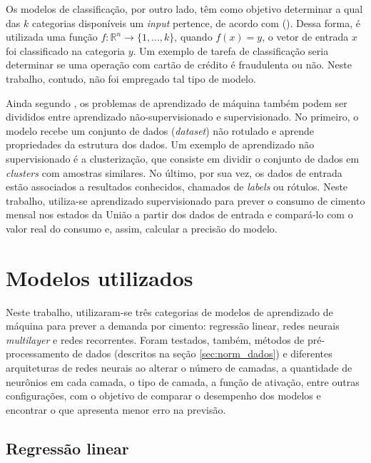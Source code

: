 Os modelos de classificação, por outro lado, têm como objetivo 
determinar a qual das $k$ categorias disponíveis um 
\textit{input} pertence, de acordo com (\cite{dl-oreilly}). Dessa forma, é utilizada uma função  
$ f : \mathbb{R}^n \rightarrow \{1,...,k\}$, quando 
$ f(x) = y$, o vetor de entrada $x$ foi classificado 
na categoria $y$. Um exemplo de tarefa de classificação
seria determinar se uma operação com cartão de crédito 
é fraudulenta ou não. Neste trabalho, contudo, não foi empregado 
tal tipo de modelo. 

Ainda segundo \cite{Goodfellow-et-al-2016}, os problemas de 
aprendizado de máquina também podem ser divididos entre
aprendizado não-supervisionado e supervisionado. No primeiro, 
o modelo recebe um conjunto de dados (\textit{dataset}) não 
rotulado e aprende propriedades da estrutura dos dados. 
Um exemplo de aprendizado não supervisionado é a clusterização,
que consiste em dividir o conjunto de dados
em \textit{clusters} com amostras similares. No último, por sua vez, 
os dados de entrada estão associados a resultados conhecidos, 
chamados de \textit{labels} ou rótulos. Neste trabalho, utiliza-se aprendizado 
supervisionado para prever o consumo de cimento mensal nos 
estados da União a partir dos dados de entrada e compará-lo 
com o valor real 
do consumo e, assim, calcular a precisão do modelo.

\section{Modelos utilizados}

Neste trabalho, utilizaram-se três categorias de modelos de aprendizado 
de máquina para prever a demanda por cimento: regressão linear, redes
neurais \textit{multilayer} e redes recorrentes. Foram testados, também,
 métodos de pré-processamento de dados (descritos na seção \ref{sec:norm_dados}) e  diferentes arquiteturas de 
redes neurais ao alterar o número de camadas, a quantidade de neurônios
em cada camada, o tipo de camada, a função de ativação, entre outras
configurações, com o objetivo de comparar 
o desempenho dos modelos e encontrar o que apresenta menor erro na previsão.

\subsection{Regressão linear}
\label{sec:reg_lin}


